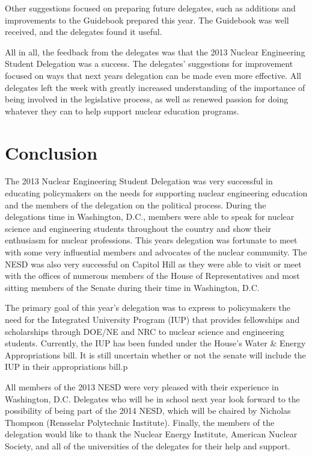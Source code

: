 \documentclass[12pt]{article}
\begin{document}
Other suggestions focused on preparing future delegates, such as additions and
improvements to the Guidebook prepared this year.  The Guidebook was well
received, and the delegates found it useful.

All in all, the feedback from the delegates was that the 2013 Nuclear
Engineering Student Delegation was a success.  The delegates’ suggestions for
improvement focused on ways that next years delegation can be made even more
effective.  All delegates left the week with greatly increased understanding of
the importance of being involved in the legislative process, as well as renewed
passion for doing whatever they can to help support nuclear education programs.

\newpage
\section{Conclusion}

The 2013 Nuclear Engineering Student Delegation was very successful in educating
policymakers on the needs for supporting nuclear engineering education and the
members of the delegation on the political process. During the delegations time
in Washington, D.C., members were able to speak for nuclear science and
engineering students throughout the country and show their enthusiasm for
nuclear professions. This years delegation was fortunate to meet with some very
influential members and advocates of the nuclear community. The NESD was also
very successful on Capitol Hill as they were able to visit or meet with the
offices of numerous members of the House of Representatives and most sitting
members of the Senate during their time in Washington, D.C.

The primary goal of this year’s delegation was to express to policymakers the
need for the Integrated University Program (IUP) that provides fellowships and
scholarships through DOE/NE and NRC to nuclear science and engineering
students. Currently, the IUP has been funded under the House's Water \& Energy
Appropriations bill. It is still uncertain whether or not the senate will
include the IUP in their appropriations bill.p

All members of the 2013 NESD were very pleased with their experience in
Washington, D.C. Delegates who will be in school next year look forward to the
possibility of being part of the 2014 NESD, which will be chaired by Nicholas
Thompson (Rensselar Polytechnic Institute). Finally, the members of the
delegation would like to thank the Nuclear Energy Institute, American Nuclear
Society, and all of the universities of the delegates for their help and
support.
\end{document}
